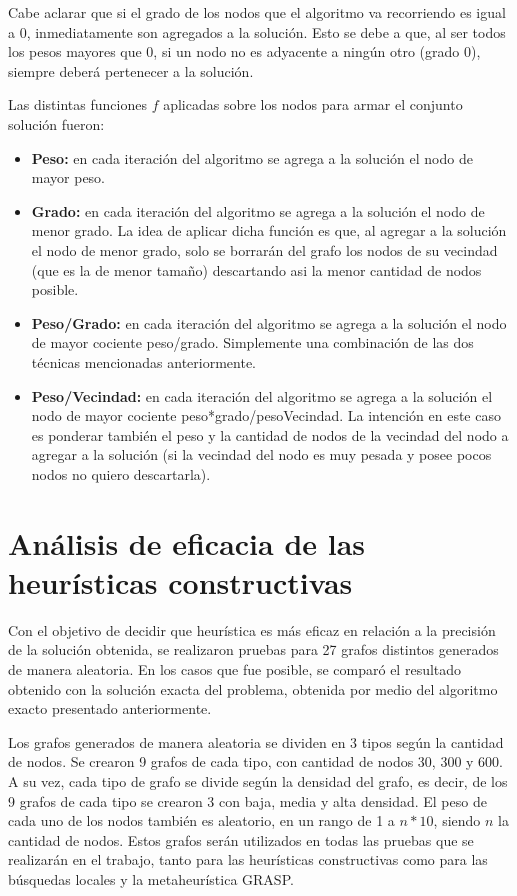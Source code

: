 \documentclass[a4paper,11pt] {article}
\begin{document}
Cabe aclarar que si el grado de los nodos que el algoritmo va recorriendo es igual a 0, inmediatamente son agregados a la soluci\'on. Esto se debe a que, al ser todos los pesos mayores que 0, si un nodo no es adyacente a ning\'un otro (grado 0), siempre deber\'a pertenecer a la soluci\'on.

Las distintas funciones $f$ aplicadas sobre los nodos para armar el conjunto soluci\'on fueron:

\begin{itemize}
\item \textbf{Peso:} en cada iteraci\'on del algoritmo se agrega a la soluci\'on el nodo de mayor peso.
\item \textbf{Grado:} en cada iteraci\'on del algoritmo se agrega a la soluci\'on el nodo de menor grado. La idea de aplicar dicha funci\'on es que, al agregar a la soluci\'on el nodo de menor grado, solo se borrar\'an del grafo los nodos de su vecindad (que es la de menor tama\~{n}o) descartando asi la menor cantidad de nodos posible.
\item \textbf{Peso/Grado:} en cada iteraci\'on del algoritmo se agrega a la soluci\'on el nodo de mayor cociente peso/grado. Simplemente una combinaci\'on de las dos t\'ecnicas mencionadas anteriormente.
\item \textbf{Peso/Vecindad:} en cada iteraci\'on del algoritmo se agrega a la soluci\'on el nodo de mayor cociente peso*grado/pesoVecindad. La intenci\'on en este caso es ponderar tambi\'en el peso y la cantidad de nodos de la vecindad del nodo a agregar a la soluci\'on (si la vecindad del nodo es muy pesada y posee pocos nodos no quiero descartarla).
\end{itemize}

\section*{An\'alisis de eficacia de las heur\'isticas constructivas}

Con el objetivo de decidir que heur\'istica es m\'as eficaz en relaci\'on a la precisi\'on de la soluci\'on obtenida, se realizaron pruebas para 27 grafos distintos generados de manera aleatoria. En los casos que fue posible, se compar\'o el resultado obtenido con la soluci\'on exacta del problema, obtenida por medio del algoritmo exacto presentado anteriormente.

Los grafos generados de manera aleatoria se dividen en 3 tipos seg\'un la cantidad de nodos. Se crearon 9 grafos de cada tipo, con cantidad de nodos 30, 300 y 600. A su vez, cada tipo de grafo se divide seg\'un la densidad del grafo, es decir, de los 9 grafos de cada tipo se crearon 3 con baja, media y alta densidad. El peso de cada uno de los nodos tambi\'en es aleatorio, en un rango de 1 a $n*10$, siendo $n$ la cantidad de nodos. Estos grafos ser\'an utilizados en todas las pruebas que se realizar\'an en el trabajo, tanto para las heur\'isticas constructivas como para las b\'usquedas locales y la metaheur\'istica GRASP.
\end{document}
